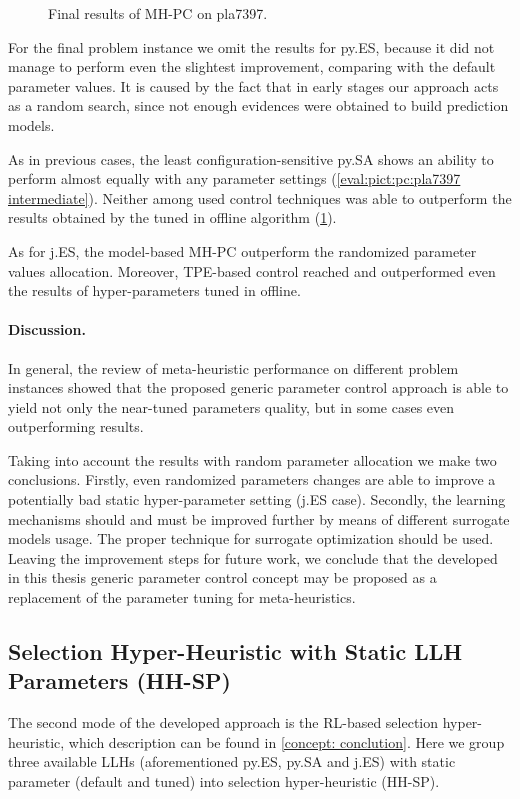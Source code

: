 \begin{figure}[b]
	\centering
	\vspace{-20pt}
	
	\caption{Final results of MH-PC on pla7397.}
	\vspace{-5pt}
	\label{eval:pict:pc:pla7397 final}
\end{figure}

For the final problem instance we omit the results for py.ES, because it did not manage to perform even the slightest improvement, comparing with the default parameter values. It is caused by the fact that in early stages our approach acts as a random search, since not enough evidences were obtained to build prediction models.

As in previous cases, the least configuration-sensitive py.SA shows an ability to perform almost equally with any parameter settings (\cref{eval:pict:pc:pla7397 intermediate}). Neither among used control techniques was able to outperform the results obtained by the tuned in offline algorithm (\cref{eval:pict:pc:pla7397 final}). 

As for j.ES, the model-based MH-PC outperform the randomized parameter values allocation. Moreover, TPE-based control reached and outperformed even the results of hyper-parameters tuned in offline.

\paragraph{Discussion.} In general, the review of meta-heuristic performance on different problem instances showed that the proposed generic parameter control approach is able to yield not only the near-tuned parameters quality, but in some cases even outperforming results.

Taking into account the results with random parameter allocation we make two conclusions. Firstly, even randomized parameters changes are able to improve a potentially bad static hyper-parameter setting (j.ES case). Secondly, the learning mechanisms should and must be improved further by means of different surrogate models usage. The proper technique for surrogate optimization should be used. Leaving the improvement steps for future work, we conclude that the developed in this thesis generic parameter control concept may be proposed as a replacement of the parameter tuning for meta-heuristics.


\subsection{Selection Hyper-Heuristic with Static LLH Parameters (HH-SP)}\label{eval:1:hh-sp}
The second mode of the developed approach is the RL-based selection hyper-heuristic, which description can be found in \cref{concept: conclution}. Here we group three available LLHs (aforementioned py.ES, py.SA and j.ES) with static parameter (default and tuned) into selection hyper-heuristic (HH-SP).

